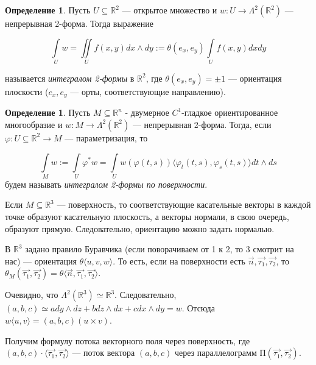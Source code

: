 \documentclass[a5paper]{article}
\newcounter{through}
\theoremstyle{plain}
\theoremstyle{definition}
\newtheorem{definition}[through]{Определение}
\numberwithin{through}{section}
\numberwithin{equation}{section}
\begin{document}
\begin{definition}
	Пусть $U \subseteq \mathbb{R}^2$ --- открытое множество и $w : U \to \Lambda^2 (\mathbb{R}^2)$ --- непрерывная 2-форма. Тогда выражение 
	
	\begin{equation*}
		\int\limits_{U} w = \iint\limits_{U} f(x, y) dx \wedge dy := \theta(e_x, e_y) \int\limits_{U} f(x, y) dxdy
	\end{equation*} 
	
	называется \textit{интегралом 2-формы} в $\mathbb{R}^2$, где $\theta(e_x, e_y) = \pm1$ --- ориентация плоскости ($e_x, e_y$ --- орты, соответствующие направлению).
\end{definition}

\begin{definition}
	Пусть $M \subseteq \mathbb{R}^n$ - двумерное $C^1$-гладкое ориентированное многообразие и $w : M \to \Lambda^2 (\mathbb{R}^2)$ --- непрерывная 2-форма. Тогда, если $\varphi : U \subseteq \mathbb{R}^2 \to M$ --- параметризация, то 
	
	\begin{equation*}
		\int\limits_{M} w := \int\limits_{U} \varphi^* w = \int\limits_{U} w(\varphi (t, s)) \langle \varphi_t (t, s), \varphi_s (t, s) \rangle dt \wedge ds
	\end{equation*}
	будем называть \textit{интегралом 2-формы по поверхности}.
\end{definition}

Если $M \subseteq \mathbb{R}^3$ --- поверхность, то соответствующие касательные векторы в каждой точке образуют касательную плоскость, а векторы нормали, в свою очередь, образуют прямую. Следовательно, ориентацию можно задать нормалью. 

В $\mathbb{R}^3$ задано правило Буравчика (если поворачиваем от 1 к 2, то 3 смотрит на нас) --- ориентация $\theta \langle u, v, w \rangle$. То есть, если на поверхности есть $\vec{n}, \vec{\tau_1}, \vec{\tau_2}$, то $\theta_M (\vec{\tau_1}, \vec{\tau_2}) = \theta \langle \vec{n}, \vec{\tau_1}, \vec{\tau_2} \rangle$.

Очевидно, что $\Lambda^2 (\mathbb{R}^3) \simeq \mathbb{R}^3$. Следовательно, $(a, b, c) \simeq a dy \wedge dz + b dz \wedge dx + c dx \wedge dy = w$. Отсюда $w \langle u, v \rangle = (a, b, c) (u \times v)$.

Получим формулу потока векторного поля через поверхность, где $(a, b, c) \cdot \langle \vec{\tau_1}, \vec{\tau_2} \rangle$ --- поток вектора $(a, b, c)$ через параллелограмм $\text{П}(\vec{\tau_1}, \vec{\tau_2})$.
\end{document}
